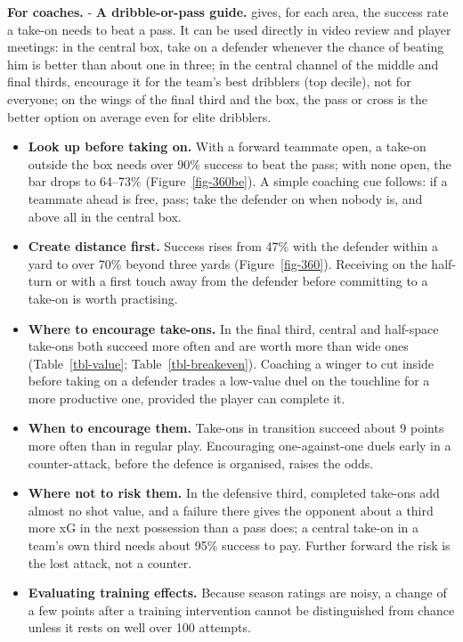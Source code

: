 \documentclass[
  12pt]{article}
\newcounter{none} %
\begin{document}
\textbf{For coaches.} - \textbf{A dribble-or-pass guide.} gives, for
each area, the success rate a take-on needs to beat a pass. It can be
used directly in video review and player meetings: in the central box,
take on a defender whenever the chance of beating him is better than
about one in three; in the central channel of the middle and final
thirds, encourage it for the team's best dribblers (top decile), not for
everyone; on the wings of the final third and the box, the pass or cross
is the better option on average even for elite dribblers.

\begin{itemize}
\item
  \textbf{Look up before taking on.} With a forward teammate open, a
  take-on outside the box needs over 90\% success to beat the pass; with
  none open, the bar drops to 64--73\% (Figure~\ref{fig-360be}). A
  simple coaching cue follows: if a teammate ahead is free, pass; take
  the defender on when nobody is, and above all in the central box.
\item
  \textbf{Create distance first.} Success rises from 47\% with the
  defender within a yard to over 70\% beyond three yards
  (Figure~\ref{fig-360}). Receiving on the half-turn or with a first
  touch away from the defender before committing to a take-on is worth
  practising.
\item
  \textbf{Where to encourage take-ons.} In the final third, central and
  half-space take-ons both succeed more often and are worth more than
  wide ones (Table~\ref{tbl-value}; Table~\ref{tbl-breakeven}). Coaching
  a winger to cut inside before taking on a defender trades a low-value
  duel on the touchline for a more productive one, provided the player
  can complete it.
\item
  \textbf{When to encourage them.} Take-ons in transition succeed about
  9 points more often than in regular play. Encouraging one-against-one
  duels early in a counter-attack, before the defence is organised,
  raises the odds.
\item
  \textbf{Where not to risk them.} In the defensive third, completed
  take-ons add almost no shot value, and a failure there gives the
  opponent about a third more xG in the next possession than a pass
  does; a central take-on in a team's own third needs about 95\% success
  to pay. Further forward the risk is the lost attack, not a counter.
\item
  \textbf{Evaluating training effects.} Because season ratings are
  noisy, a change of a few points after a training intervention cannot
  be distinguished from chance unless it rests on well over 100
  attempts.
\end{itemize}
\end{document}
